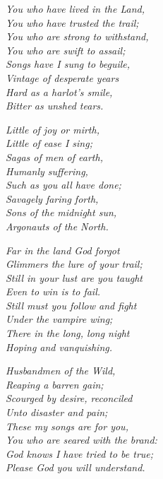

\begin{poemblock}

\textit{
You who have lived in the Land,\\
\idt You who have trusted the trail;\\
You who are strong to withstand,\\
\idt You who are swift to assail;\\
Songs have I sung to beguile,\\
\idt Vintage of desperate years\\
Hard as a harlot's smile,\\
\idt Bitter as unshed tears.
}

\indentedblock\itshape{
Little of joy or mirth,\\
\idt Little of ease I sing;\\
Sagas of men of earth,\\
\idt Humanly suffering,\\
Such as you all have done;\\
\idt Savagely faring forth,\\
Sons of the midnight sun,\\
\idt Argonauts of the North.
}

\textit{
Far in the land God forgot\\
\idt Glimmers the lure of your trail;\\
Still in your lust are you taught\\
\idt Even to win is to fail.\\
Still must you follow and fight\\
\idt Under the vampire wing;\\
There in the long, long night\\
\idt Hoping and vanquishing.
}

\indentedblock\itshape{
Husbandmen of the Wild,\\
\idt Reaping a barren gain;\\
Scourged by desire, reconciled\\
\idt Unto disaster and pain;\\
These my songs are for you,\\
\idt You who are seared with the brand:\\
God knows I have tried to be true;\\
\idt Please God you will understand.
}

\end{poemblock}
